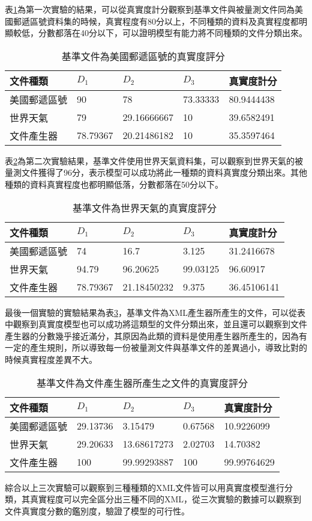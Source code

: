 表\ref{zipbase}為第一次實驗的結果，可以從真實度計分觀察到基準文件與被量測文件同為美國郵遞區號資料集的時候，真實程度有80分以上，不同種類的資料及真實程度都明顯較低，分數都落在40分以下，可以證明模型有能力將不同種類的文件分類出來。
\begin{table}[H]
\begin{center}
\caption{基準文件為美國郵遞區號的真實度評分}
\label{zipbase}
\begin{tabular}{|p{3cm}<{\centering}|p{2.5cm}<{\centering}|p{2cm}<{\centering}|p{2cm}<{\centering}|p{2cm}<{\centering}|}
\hline
文件種類& $D_1$ &$D_2$ &$D_3$ & 真實度計分 \\
\hline
美國郵遞區號&90&78&73.33333 &80.9444438\\
\hline
世界天氣&79&29.16666667&10 &39.6582491\\
\hline
文件產生器 &78.79367&20.21486182&10&35.3597464\\
\hline
\end{tabular}
\end{center}
\end{table}
表\ref{weatherbase}為第二次實驗結果，基準文件使用世界天氣資料集，可以觀察到世界天氣的被量測文件獲得了96分，表示模型可以成功將此一種類的資料真實度分類出來。其他種類的資料真實程度也都明顯低落，分數都落在50分以下。
\begin{table}[H]
\begin{center}
\caption{基準文件為世界天氣的真實度評分}
\label{weatherbase}
\begin{tabular}{|p{3cm}<{\centering}|p{2.5cm}<{\centering}|p{2cm}<{\centering}|p{2cm}<{\centering}|p{2cm}<{\centering}|}
\hline
文件種類& $D_1$ &$D_2$ &$D_3$ & 真實度計分 \\
\hline
美國郵遞區號&74&16.7&3.125 &31.2416678\\
\hline
世界天氣&94.79&96.20625&99.03125 &96.60917\\
\hline
文件產生器&78.79367&21.18450232&9.375 &36.45106141\\
\hline
\end{tabular}
\end{center}
\end{table}
最後一個實驗的實驗結果為表\ref{docbase}，基準文件為XML產生器所產生的文件，可以從表中觀察到真實度模型也可以成功將這類型的文件分類出來，並且還可以觀察到文件產生器的分數幾乎接近滿分，其原因為此類的資料是使用產生器所產生的，因為有一定的產生規則，所以導致每一份被量測文件與基準文件的差異過小，導致比對的時候真實程度差異不大。
\begin{table}[H]
\begin{center}
\caption{基準文件為文件產生器所產生之文件的真實度評分}
\label{docbase}
\begin{tabular}{|p{3cm}<{\centering}|p{2.5cm}<{\centering}|p{2cm}<{\centering}|p{2cm}<{\centering}|p{2cm}<{\centering}|}
\hline
文件種類& $D_1$ &$D_2$ &$D_3$  & 真實度計分\\
\hline
美國郵遞區號&29.13736	&3.15479&0.67568 &10.9226099	\\
\hline   
世界天氣&29.20633&13.68617273&2.02703 &14.70382\\
\hline
文件產生器&100&99.99293887&100 &99.99764629\\
\hline
\end{tabular}
\end{center}
\end{table}
綜合以上三次實驗可以觀察到三種種類的XML文件皆可以用真實度模型進行分類，其真實程度可以完全區分出三種不同的XML，從三次實驗的數據可以觀察到文件真實度分數的鑑別度，驗證了模型的可行性。